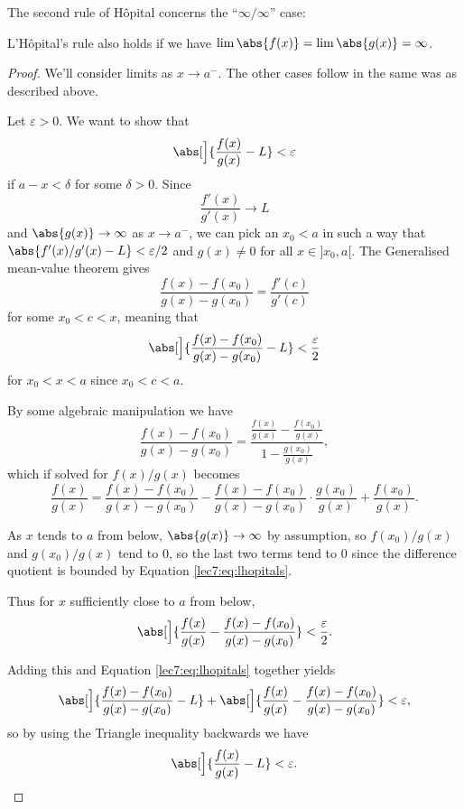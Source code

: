 \noindent
The second rule of H\^{o}pital concerns the ``$\infty / \infty$'' case:

\begin{theorem}
	L'H\^{o}pital's rule also holds if we have $\lim \abs{f(x)} = \lim \abs{g(x)} = \infty$.
\end{theorem}

\begin{proof}
	We'll consider limits as $x \to a^-$.
	The other cases follow in the same was as described above.

	Let $\varepsilon > 0$.
	We want to show that
	\[
		\abs[\Big]{\frac{f(x)}{g(x)} - L} < \varepsilon
	\]
	if $a - x < \delta$ for some $\delta > 0$.
	Since
	\[
		\frac{f'(x)}{g'(x)} \to L
	\]
	and $\abs{g(x)} \to \infty$ as $x \to a^-$, we can pick an $x_0 < a$ in such a way that $\abs{f'(x) / g'(x) - L} < \varepsilon/2$ and $g(x) \neq 0$ for all $x \in {]{x_0, a}[}$.
	The Generalised mean-value theorem gives
	\[
		\frac{f(x) - f(x_0)}{g(x) - g(x_0)} = \frac{f'(c)}{g'(c)}
	\]
	for some $x_0 < c < x$, meaning that
	\begin{equation}\label{lec7:eq:lhopitals}
		\abs[\Big]{\frac{f(x) - f(x_0)}{g(x) - g(x_0)} - L} < \frac{\varepsilon}{2}
	\end{equation}
	for $x_0 < x < a$ since $x_0 < c < a$.

	By some algebraic manipulation we have
	\[
		\frac{f(x) - f(x_0)}{g(x) - g(x_0)} = \frac{\frac{f(x)}{g(x)} - \frac{f(x_0)}{g(x)}}{1 - \frac{g(x_0)}{g(x)}},
	\]
	which if solved for $f(x)/g(x)$ becomes
	\[
		\frac{f(x)}{g(x)} = \frac{f(x) - f(x_0)}{g(x) - g(x_0)} - \frac{f(x) - f(x_0)}{g(x) - g(x_0)} \cdot \frac{g(x_0)}{g(x)} + \frac{f(x_0)}{g(x)}.
	\]

	\noindent
	As $x$ tends to $a$ from below, $\abs{g(x)} \to \infty$ by assumption, so $f(x_0) / g(x)$ and $g(x_0) / g(x)$ tend to $0$, so the last two terms tend to $0$ since the difference quotient is bounded by Equation \eqref{lec7:eq:lhopitals}.

	Thus for $x$ sufficiently close to $a$ from below,
	\[
		\abs[\Big]{\frac{f(x)}{g(x)} - \frac{f(x) - f(x_0)}{g(x) - g(x_0)}} < \frac{\varepsilon}{2}.
	\]

	\noindent
	Adding this and Equation \eqref{lec7:eq:lhopitals} together yields
	\[
		\abs[\Big]{\frac{f(x) - f(x_0)}{g(x) - g(x_0)} - L} + \abs[\Big]{\frac{f(x)}{g(x)} - \frac{f(x) - f(x_0)}{g(x) - g(x_0)}}  < \varepsilon,
	\]
	so by using the Triangle inequality backwards we have
	\[
		\abs[\Big]{\frac{f(x)}{g(x)} - L} < \varepsilon. \qedhere
	\]
\end{proof}
